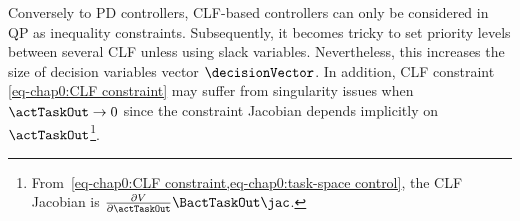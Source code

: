 Conversely to PD controllers, CLF-based controllers can only be considered in QP as inequality constraints. Subsequently, it becomes tricky to set priority levels between several CLF unless using slack variables. Nevertheless, this increases the size of decision variables vector $\decisionVector$. In addition, CLF constraint \cref{eq-chap0:CLF constraint} may suffer from singularity issues when $\actTaskOut\rightarrow0$ since the constraint Jacobian depends implicitly on $\actTaskOut$\footnote{From~\cref{eq-chap0:CLF constraint,eq-chap0:task-space control}, the CLF Jacobian is $\frac{\partial V}{\partial \actTaskOut}\BactTaskOut\jac$.}. 
